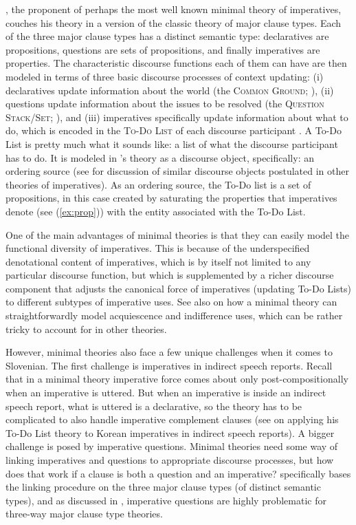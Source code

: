 \documentclass[output=paper,colorlinks,citecolor=brown]{langscibook}
\begin{document}
\textcite{portnerSALT,portner07}, the proponent of perhaps the most well known minimal theory of imperatives, couches his theory in a version of the classic theory of major clause types. Each of the three major clause types has a distinct semantic type: declaratives are propositions, questions are sets of propositions, and finally imperatives are properties. The characteristic discourse functions each of them can have are then modeled in terms of three basic discourse processes of context updating: (i) declaratives update information about the world (the \textsc{Common Ground}; \cite{Stalnaker1978,stalnaker02}), (ii) questions update information about the issues to be resolved (the \textsc{Question Stack/Set}; \cite{ginzburg95a,ginzburg95b,Roberts2012}), and (iii) imperatives specifically update information about what to do, which is encoded in the \textsc{To-Do List} of each discourse participant \citep{portnerSALT,portner07}. 
A To-Do List is pretty much what it sounds like: a list of what the discourse participant has to do. It is modeled in \citeauthor{portner07}'s theory as a discourse object, specifically: an ordering source (see \cite{kaufmann21} for discussion of similar discourse objects postulated in other theories of imperatives). As an ordering source, the To-Do list is a set of propositions, in this case created by saturating the properties that imperatives denote (see (\ref{ex:prop})) with the entity associated with the To-Do List.

One of the main advantages of minimal theories is that they can easily model the functional diversity of imperatives. This is because of the underspecified denotational content of imperatives, which is by itself not limited to any particular discourse function, but which is supplemented by a richer discourse component that adjusts the canonical force of imperatives (updating To-Do Lists) to different subtypes of imperative uses. See also \textcite{finteliatridou17} on how a minimal theory can straightforwardly model acquiescence and indifference uses, which can be rather tricky to account for in other theories.  

However, minimal theories also face a few unique challenges when it comes to Slovenian. The first challenge is imperatives in indirect speech reports. Recall that in a minimal theory imperative force comes about only post-compositionally when an imperative is uttered. But when an imperative is inside an indirect speech report, what is uttered is a declarative, so the theory has to be complicated to also handle imperative complement clauses (see \cite{portner07} on applying his To-Do List theory to Korean imperatives in indirect speech reports). A bigger challenge is posed by imperative questions. Minimal theories need some way of linking imperatives and questions to appropriate discourse processes, but how does that work if a clause is both a question and an imperative? \textcite{portnerSALT,portner07} specifically bases the linking procedure on the three major clause types (of distinct semantic types), and as discussed in , imperative questions are highly problematic for three-way major clause type theories.      
\end{document}
